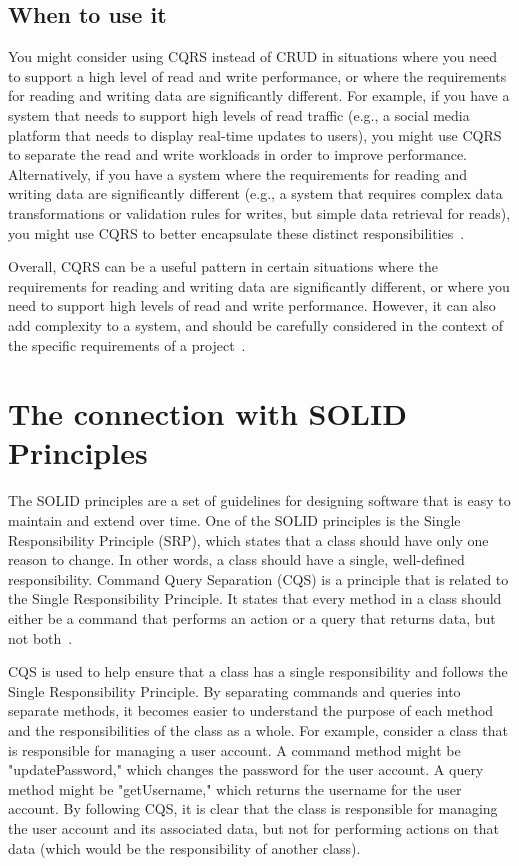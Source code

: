 \documentclass[11pt,conference]{IEEEtran}
\begin{document}
\subsection{When to use it}

You might consider using CQRS instead of CRUD in situations where you need to support a high level of read and write performance, or where the requirements for reading and writing data are significantly different. For example, if you have a system that needs to support high levels of read traffic (e.g., a social media platform that needs to display real-time updates to users), you might use CQRS to separate the read and write workloads in order to improve performance. Alternatively, if you have a system where the requirements for reading and writing data are significantly different (e.g., a system that requires complex data transformations or validation rules for writes, but simple data retrieval for reads), you might use CQRS to better encapsulate these distinct responsibilities~\cite{martinfowler-cqrs}.

Overall, CQRS can be a useful pattern in certain situations where the requirements for reading and writing data are significantly different, or where you need to support high levels of read and write performance. However, it can also add complexity to a system, and should be carefully considered in the context of the specific requirements of a project~\cite{martinfowler-cqrs}.

\section{The connection with SOLID Principles}

The SOLID principles are a set of guidelines for designing software that is easy to maintain and extend over time.
One of the SOLID principles is the Single Responsibility Principle (SRP), which states that a class should have only one reason to change. In other words, a class should have a single, well-defined responsibility.
Command Query Separation (CQS) is a principle that is related to the Single Responsibility Principle. It states that every method in a class should either be a command that performs an action or a query that returns data, but not both~\cite{solid-principles}.

CQS is used to help ensure that a class has a single responsibility and follows the Single Responsibility Principle. By separating commands and queries into separate methods, it becomes easier to understand the purpose of each method and the responsibilities of the class as a whole.
For example, consider a class that is responsible for managing a user account. A command method might be "updatePassword," which changes the password for the user account. A query method might be "getUsername," which returns the username for the user account. By following CQS, it is clear that the class is responsible for managing the user account and its associated data, but not for performing actions on that data (which would be the responsibility of another class).
\end{document}
